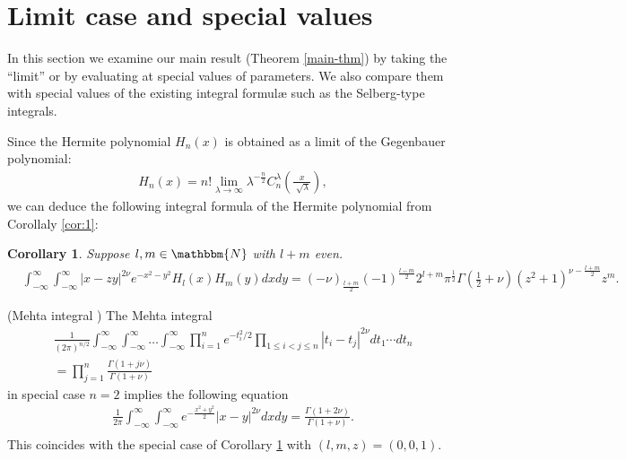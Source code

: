 \documentclass{svjour3}
\newtheorem{corollary}{Corollary}
{\theorembodyfont{\rmfamily}\newtheorem{example}{Example}}
\begin{document}
\section{Limit case and special values}\label{sec:4}

In this section we examine our main result (Theorem \ref{main-thm}) by taking
the ``limit'' or by evaluating at special values of parameters. We also
compare them with special values of the existing integral formul{\ae} such as
the Selberg-type integrals.

Since the Hermite polynomial $H_n (x)$ is obtained as a limit of the
Gegenbauer polynomial:
\begin{eqnarray}
  & H_n (x) = n! \lim_{\lambda \rightarrow \infty} \lambda^{- \frac{n}{2}}
  C_n^{\lambda} \left( \frac{x}{\sqrt[]{\lambda}} \right), &  \nonumber
\end{eqnarray}
we can deduce the following integral formula of the Hermite polynomial from
Corollaly \ref{cor:1}:

\begin{corollary}
  \label{cor:Hermite}Suppose $l, m \in \mathbbm{N}$ with $l + m$ even.
  \begin{eqnarray}
    & \int_{- \infty}^{\infty} \int_{- \infty}^{\infty} | x - z y |^{2 \nu}
    e^{- x^2 - y^2} H_l (x) H_m (y) d x d y = (- \nu)_{\frac{l + m}{2}} (-
    1)^{\frac{l - m}{2}} 2^{l + m} \pi^{\frac{1}{2}} \Gamma \left( \frac{1}{2}
    + \nu \right) (z^2 + 1)^{\nu - \frac{l + m}{2}} z^m . &  \nonumber
  \end{eqnarray}
\end{corollary}

\begin{example}
  (Mehta integral {\cite{mehta2004random}}) The Mehta integral
  \begin{eqnarray}
    & \frac{1}{(2 \pi)^{n / 2}} \int_{- \infty}^{\infty} \int_{-
    \infty}^{\infty} \ldots \int_{- \infty}^{\infty} \prod_{i = 1}^n e^{-
    t_i^2 / 2}_{} \prod_{1 \leqslant i < j \leqslant n} | t_i - t_j |^{2 \nu}
    d t_1 \cdots d t_n &  \nonumber\\
    & = \prod_{j = 1}^n \frac{\Gamma (1 + j \nu)}{\Gamma (1 + \nu)} & 
    \nonumber
  \end{eqnarray}
  in special case $n = 2$ implies the following equation
  \begin{eqnarray}
    & \frac{1}{2 \pi} \int_{- \infty}^{\infty} \int_{- \infty}^{\infty} e^{-
    \frac{x^2 + y^2}{2}} | x - y |^{2 \nu} d x d y = \frac{\Gamma (1 + 2
    \nu)}{\Gamma (1 + \nu)} . &  \nonumber\\
    &  &  \nonumber
  \end{eqnarray}
  This coincides with the special case of Corollary \ref{cor:Hermite} with
  $(l, m, z) = (0, 0, 1)$.
\end{example}
\end{document}
